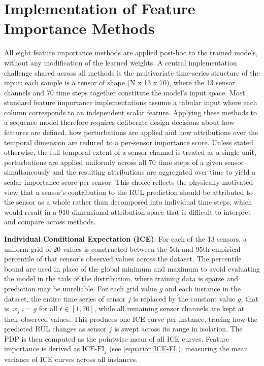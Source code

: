 
\section{Implementation of Feature Importance Methods}
All eight feature importance methods are applied post-hoc to the trained models, without any modification of the learned weights. A central implementation challenge shared across all methods is the multivariate time-series structure of the input: each sample is a tensor of shape (N x 13 x 70), where the 13 sensor channels and 70 time steps together constitute the model's input space. Most standard feature importance implementations assume a tabular input where each column corresponds to an independent scalar feature. Applying these methods to a sequence model therefore requires deliberate design decisions about how features are defined, how perturbations are applied and how attributions over the temporal dimension are reduced to a per-sensor importance score. Unless stated otherwise, the full temporal extent of a sensor channel is treated as a single unit, perturbations are applied uniformly across all 70 time steps of a given sensor simultaneously and the resulting attributions are aggregated over time to yield a scalar importance score per sensor. This choice reflects the physically motivated view that a sensor's contribution to the RUL prediction should be attributed to the sensor as a whole rather than decomposed into individual time steps, which would result in a 910-dimensional attribution space that is difficult to interpret and compare across methods.

\textbf{Individual Conditional Expectation (ICE)}: For each of the 13 sensors, a uniform grid of 20 values is constructed between the 5th and 95th empirical percentile of that sensor's observed values across the dataset. The percentile bound are used in place of the global minimum and maximum to avoid evaluating the model in the tails of the distribution, where training data is sparse and prediction may be unreliable. For each grid value $g$ and each instance in the dataset, the entire time series of sensor $j$ is replaced by the constant value $g$, that is, $x_{j,t} = g$ for all $t \in [1, 70]$, while all remaining sensor channels are kept at their observed values. This produces one ICE curve per instance, tracing how the predicted RUL changes as sensor $j$ is swept across its range in isolation. The PDP is then computed as the pointwise mean of all ICE curves. Feature importance is derived as $\mathrm{ICE\text{-}FI}_j$ (see \ref{equation:ICE-FI}), measuring the mean variance of ICE curves across all instances.

